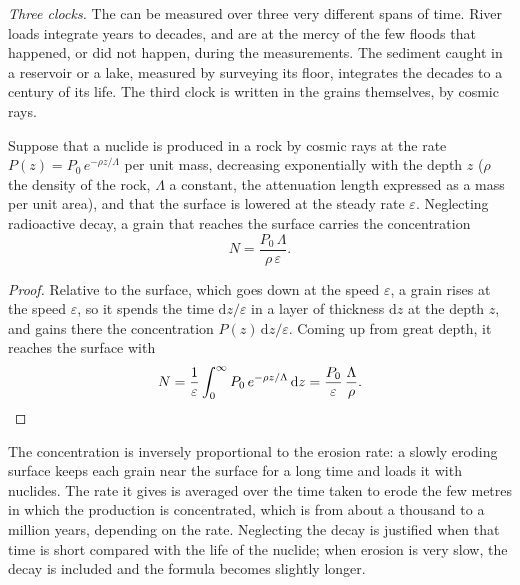 \emph{Three clocks.} The  can be measured over three very
different spans of time. River loads integrate years to decades, and are at
the mercy of the few floods that happened, or did not happen, during the
measurements. The sediment caught in a reservoir or a lake, measured by
surveying its floor, integrates the decades to a century of its life. The
third clock is written in the grains themselves, by cosmic rays.

\begin{proposition}\label{prop:b1:erosion-transport:cosmogenic}
Suppose that a nuclide is produced in a rock by cosmic rays at the rate
$P(z) = P_0\,e^{-\rho z/\Lambda}$ per unit mass, decreasing exponentially with
the depth $z$ ($\rho$ the density of the rock, $\Lambda$ a constant, the
attenuation length expressed as a mass per unit area), and that the surface is
lowered at the steady rate $\varepsilon$. Neglecting radioactive decay, a grain
that reaches the surface carries the concentration
\[
  N = \frac{P_0\,\Lambda}{\rho\,\varepsilon}.
\]
\end{proposition}

\begin{proof}
Relative to the surface, which goes down at the speed $\varepsilon$, a grain
rises at the speed $\varepsilon$, so it spends the time $\mathrm dz/\varepsilon$
in a layer of thickness $\mathrm dz$ at the depth $z$, and gains there the
concentration $P(z)\,\mathrm dz/\varepsilon$. Coming up from great depth, it
reaches the surface with
\[
  N = \frac{1}{\varepsilon}\int_0^{\infty} P_0\,e^{-\rho z/\Lambda}\,\mathrm dz
  = \frac{P_0}{\varepsilon}\,\frac{\Lambda}{\rho}. \qedhere
\]
\end{proof}

The concentration is inversely proportional to the erosion rate: a slowly
eroding surface keeps each grain near the surface for a long time and loads it
with nuclides. The rate it gives is averaged over the time taken to erode the
few metres in which the production is concentrated, which is from about a
thousand to a million years, depending on the rate. Neglecting the decay is
justified when that time is short compared with the life of the nuclide; when
erosion is very slow, the decay is included and the formula becomes slightly
longer.

